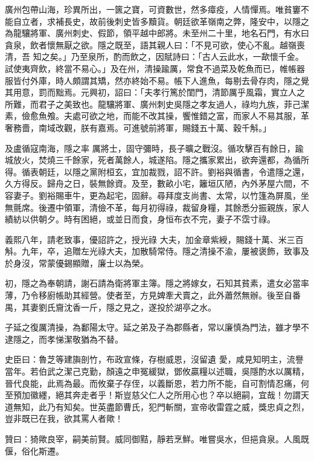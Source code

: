 \begin{pinyinscope}
 廣州包帶山海，珍異所出，一篋之寶，可資數世，然多瘴疫，人情憚焉。唯貧窶不能自立者，求補長史，故前後刺史皆多黷貨。朝廷欲革嶺南之弊，隆安中，以隱之為龍驤將軍、廣州刺史、假節，領平越中郎將。未至州二十里，地名石門，有水曰貪泉，飲者懷無厭之欲。隱之既至，語其親人曰：「不見可欲，使心不亂。越嶺喪清，吾
 知之矣。」乃至泉所，酌而飲之，因賦詩曰：「古人云此水，一歃懷千金。試使夷齊飲，終當不易心。」及在州，清操踰厲，常食不過菜及乾魚而已，帷帳器服皆付外庫，時人頗謂其矯，然亦終始不易。帳下人進魚，每剔去骨存肉，隱之覺其用意，罰而黜焉。元興初，詔曰：「夫孝行篤於閨門，清節厲乎風霜，實立人之所難，而君子之美致也。龍驤將軍、廣州刺史吳隱之孝友過人，祿均九族，菲己潔素，儉愈魚飧。夫處可欲之地，而能不改其操，饗惟錯之富，而家人不易其服，革奢務嗇，南域改觀，朕有嘉焉。可進號前將軍，賜錢五十萬、穀千斛。」



 及盧循寇南海，隱之率
 厲將士，固守彌時，長子曠之戰沒。循攻擊百有餘日，踰城放火，焚燒三千餘家，死者萬餘人，城遂陷。隱之攜家累出，欲奔還都，為循所得。循表朝廷，以隱之黨附桓玄，宜加裁戮，詔不許。劉裕與循書，令遣隱之還，久方得反。歸舟之日，裝無餘資。及至，數畝小宅，籬垣仄陋，內外茅屋六間，不容妻子。劉裕賜車牛，更為起宅，固辭。尋拜度支尚書、太常，以竹篷為屏風，坐無氈席。後遷中領軍，清儉不革，每月初得祿，裁留身糧，其餘悉分振親族，家人績紡以供朝夕。時有困絕，或並日而食，身恒布衣不完，妻子不霑寸祿。



 義熙八年，請老致事，優詔許之，授光祿
 大夫，加金章紫綬，賜錢十萬、米三百斛。九年，卒，追贈左光祿大夫，加散騎常侍。隱之清操不渝，屢被褒飾，致事及於身沒，常蒙優錫顯贈，廉士以為榮。



 初，隱之為奉朝請，謝石請為衛將軍主簿。隱之將嫁女，石知其貧素，遣女必當率薄，乃令移廚帳助其經營。使者至，方見婢牽犬賣之，此外蕭然無辦。後至自番禺，其妻劉氏齎沈香一斤，隱之見之，遂投於湖亭之水。



 子延之復厲清操，為鄱陽太守。延之弟及子為郡縣者，常以廉慎為門法，雖才學不逮隱之，而孝悌潔敬猶為不替。



 史臣曰：魯芝等建旟剖竹，布政宣條，存樹威恩，沒留遺
 愛，咸見知明主，流譽當年。若伯武之潔己克勤，顏遠之申冤緩獄，鄧攸贏糧以述職，吳隱酌水以厲精，晉代良能，此焉為最。而攸棄子存侄，以義斷恩，若力所不能，自可割情忍痛，何至預加徽纆，絕其奔走者乎！斯豈慈父仁人之所用心也？卒以絕嗣，宜哉！勿謂天道無知，此乃有知矣。世英盡節曹氏，犯門斬關，宣帝收雷霆之威，獎忠貞之烈，豈非既已在我，欲其罵人者歟！



 贊曰：猗歟良宰，嗣美前賢。威同御黠，靜若烹鮮。唯嘗吳水，但挹貪泉。人風既偃，俗化斯遷。



\end{pinyinscope}